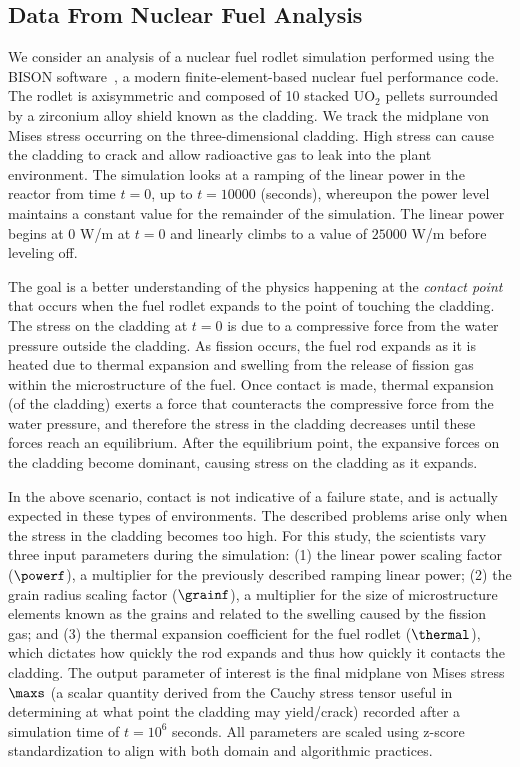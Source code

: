 \subsection{Data From Nuclear Fuel Analysis}
\label{sec:applicationBackground}
We consider an analysis of a nuclear fuel rodlet simulation performed using the BISON software~\cite{HalesNovasconePastore2013}, a modern finite-element-based nuclear fuel performance code.
%
The rodlet is axisymmetric and composed of 10 stacked UO$_2$ pellets surrounded by a zirconium alloy shield known as the cladding.
%
We track the midplane von Mises stress occurring on the three-dimensional cladding.
%
High stress can cause the cladding to crack and allow radioactive gas to leak into the plant environment.
%
The simulation looks at a ramping of the linear power in the reactor from time $t=0$, up to $t=10000$ (seconds), whereupon the power level maintains a constant value for the remainder of the simulation.
%
The linear power begins at $0$ W/m at $t=0$ and linearly climbs to a value of $25000$ W/m before leveling off.

The goal is a better understanding of the physics happening at the \emph{contact point} that occurs when the fuel rodlet expands to the point of touching the cladding.
%
The stress on the cladding at $t=0$ is due to a compressive force from the water pressure outside the cladding.
%
As fission occurs, the fuel rod expands as it is heated due to thermal expansion and swelling from the release of fission gas within the microstructure of the fuel.
%
Once contact is made, thermal expansion (of the cladding) exerts a force that counteracts the compressive force from the water pressure, and therefore the stress in the cladding decreases until these forces reach an equilibrium.
%
After the equilibrium point, the expansive forces on the cladding become dominant, causing stress on the cladding as it expands.

In the above scenario, contact is not indicative of a failure state, and is actually expected in these types of environments.
%
The described problems arise only when the stress in the cladding becomes too high.
%
For this study, the scientists vary three input parameters during the simulation: (1) the linear power scaling factor ($\powerf$), a multiplier for the previously described ramping linear power; (2) the grain radius scaling factor ($\grainf$), a multiplier for the size of microstructure elements known as the grains and related to the swelling caused by the fission gas; and (3) the thermal expansion coefficient for the fuel rodlet ($\thermal$), which dictates how quickly the rod expands and thus how quickly it contacts the cladding.
%
The output parameter of interest is the final midplane von Mises stress $\maxs$ (a scalar quantity derived from the Cauchy stress tensor useful in determining at what point the cladding may yield/crack) recorded after a simulation time of $t=10^6$ seconds.
%
All parameters are scaled using z-score standardization to align with both domain and algorithmic practices.

